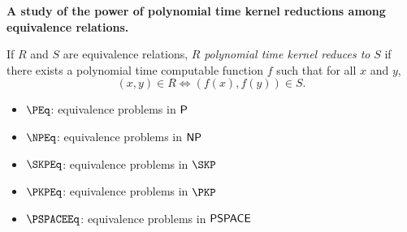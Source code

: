 {\setlength{\parindent}{0cm}\textbf{\large A study of the power of polynomial time kernel reductions among equivalence relations.}}

\vspace{0.5cm}

\begin{definition}
  If $R$ and $S$ are equivalence relations, $R$ \emph{polynomial time kernel reduces to} $S$ if there exists a polynomial time computable function $f$ such that for all $x$ and $y$,
  \begin{displaymath}
    (x, y)\in R \iff (f(x), f(y))\in S.
  \end{displaymath}
\end{definition}

\vspace{0.5cm}

\begin{definition}\mbox{}
  \begin{itemize}
    \renewcommand{\labelitemi}{$\cdot$}
  \item $\PEq$: equivalence problems in $\P$
  \item $\NPEq$: equivalence problems in $\NP$
  \item $\SKPEq$: equivalence problems in $\SKP$
  \item $\PKPEq$: equivalence problems in $\PKP$
  \item $\PSPACEEq$: equivalence problems in $\PSPACE$
  \end{itemize}
\end{definition}
